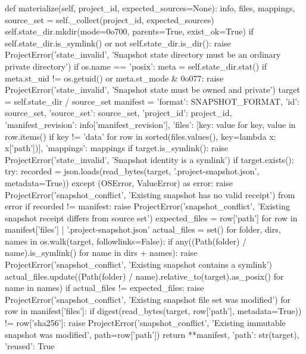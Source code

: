     def materialize(self, project_id, expected_sources=None):
        info, files, mappings, source_set = self._collect(project_id, expected_sources)
        self.state_dir.mkdir(mode=0o700, parents=True, exist_ok=True)
        if self.state_dir.is_symlink() or not self.state_dir.is_dir():
            raise ProjectError('state_invalid', 'Snapshot state directory must be an ordinary private directory')
        if os.name == 'posix':
            meta = self.state_dir.stat()
            if meta.st_uid != os.getuid() or meta.st_mode & 0o077:
                raise ProjectError('state_invalid', 'Snapshot state must be owned and private')
        target = self.state_dir / source_set
        manifest = {'format': SNAPSHOT_FORMAT, 'id': source_set, 'source_set': source_set,
                    'project_id': project_id, 'manifest_revision': info['manifest_revision'],
                    'files': [{key: value for key, value in row.items() if key != 'data'}
                              for row in sorted(files.values(), key=lambda x: x['path'])],
                    'mappings': mappings}
        if target.is_symlink():
            raise ProjectError('state_invalid', 'Snapshot identity is a symlink')
        if target.exists():
            try:
                recorded = json.loads(read_bytes(target, '.project-snapshot.json', metadata=True))
            except (OSError, ValueError) as error:
                raise ProjectError('snapshot_conflict', 'Existing snapshot has no valid receipt') from error
            if recorded != manifest:
                raise ProjectError('snapshot_conflict', 'Existing snapshot receipt differs from source set')
            expected_files = {row['path'] for row in manifest['files']} | {'.project-snapshot.json'}
            actual_files = set()
            for folder, dirs, names in os.walk(target, followlinks=False):
                if any((Path(folder) / name).is_symlink() for name in dirs + names):
                    raise ProjectError('snapshot_conflict', 'Existing snapshot contains a symlink')
                actual_files.update((Path(folder) / name).relative_to(target).as_posix() for name in names)
            if actual_files != expected_files:
                raise ProjectError('snapshot_conflict', 'Existing snapshot file set was modified')
            for row in manifest['files']:
                if digest(read_bytes(target, row['path'], metadata=True)) != row['sha256']:
                    raise ProjectError('snapshot_conflict', 'Existing immutable snapshot was modified', path=row['path'])
            return {**manifest, 'path': str(target), 'reused': True}
